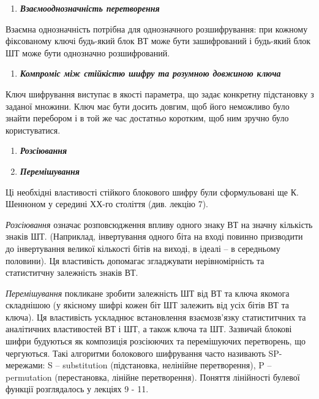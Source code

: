 \documentclass[a4paper]{article}
\newcounter{saveenum}
\newcommand\liststyleWWviiiNumix{%
\renewcommand\theenumi{\arabic{enumi}}
\renewcommand\theenumii{\arabic{enumii}}
\renewcommand\theenumiii{\arabic{enumiii}}
\renewcommand\theenumiv{\arabic{enumiv}}
\renewcommand\labelenumi{\theenumi.}
\renewcommand\labelenumii{\theenumii.}
\renewcommand\labelenumiii{\theenumiii.}
\renewcommand\labelenumiv{\theenumiv.}
}
\newcommand\liststyleWWviiiNumlv{%
\renewcommand\theenumi{\arabic{enumi}}
\renewcommand\theenumii{\alph{enumii}}
\renewcommand\theenumiii{\roman{enumiii}}
\renewcommand\theenumiv{\arabic{enumiv}}
\renewcommand\labelenumi{\theenumi.}
\renewcommand\labelenumii{\theenumii.}
\renewcommand\labelenumiii{\theenumiii.}
\renewcommand\labelenumiv{\theenumiv.}
}
\newcounter{}
\begin{document}
\bigskip

\liststyleWWviiiNumix
\begin{enumerate}
\item {\bfseries\itshape
Взаємооднозначність перетворення}
\end{enumerate}
 Взаємна однозначність потрібна для однозначного розшифрування: при кожному
фіксованому ключі будь-який блок ВТ може бути зашифрований і будь-який блок ШТ
може бути однозначно розшифрований.


\bigskip

\liststyleWWviiiNumix
\setcounter{saveenum}{\value{enumi}}
\begin{enumerate}
\setcounter{enumi}{\value{saveenum}}
\item {\bfseries\itshape
Компроміс між стійкістю шифру та розумною довжиною  ключа}
\end{enumerate}
 Ключ шифрування виступає в якості параметра, що задає конкретну підстановку з
заданої множини. Ключ має бути досить довгим, щоб його неможливо було знайти
перебором і в той же час достатньо коротким, щоб ним зручно було користуватися.

\liststyleWWviiiNumlv
\begin{enumerate}
\item {\bfseries\itshape
Розсіювання}
\item {\bfseries\itshape
Перемішування}
\end{enumerate}
Ці необхідні властивості стійкого блокового шифру були сформульовані ще К.
Шенноном  у середині ХХ-го століття (див. лекцію 7). 

\textit{Розсіювання} означає розповсюдження впливу одного знаку ВТ на значну
кількість знаків ШТ. (Наприклад, інвертування одного біта на вході повинно
призводити до інвертування великої кількості бітів на виході, в ідеалі – в
середньому половини). Ця властивість допомагає згладжувати нерівномірність та
статиститчну залежність знаків ВТ.\textit{ }

\textit{Перемішування} покликане зробити залежність ШТ від ВТ та ключа якомога
складнішою (у якісному шифрі кожен біт ШТ залежить від усіх бітів ВТ та ключа).
Ця властивість ускладнює встановлення взаємозв’язку статиститчних та
аналітичних властивостей ВТ і ШТ, а також ключа та ШТ. Зазвичай блокові шифри
будуються як\textbf{ }композиція  розсіюючих та\textbf{ }перемішуючих
перетворень, що чергуються. Такі алгоритми болокового шифрування часто
називають SP{}-мережами: S – substitution (підстановка, нелінійне
перетворення), P – permutation (перестановка, лінійне перетворення). Поняття
лінійності булевої функції розглядалось у лекціях 9 - 11.
\end{document}
